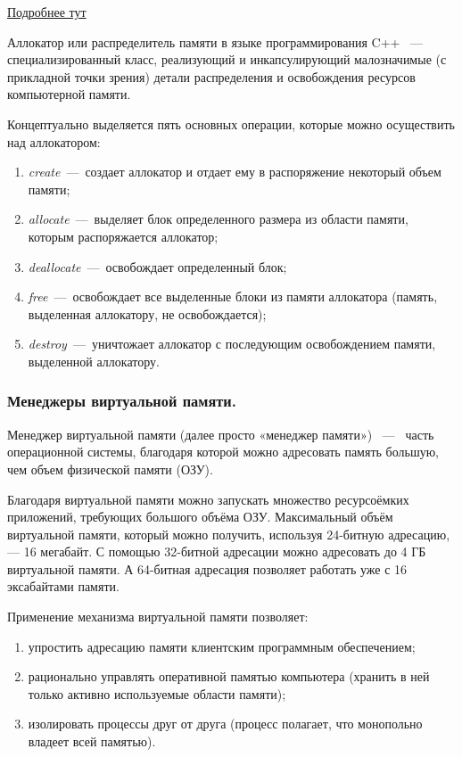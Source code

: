 \href{https://habr.com/ru/post/505632/}{Подробнее тут}

Аллокатор или распределитель памяти в языке программирования C++ ~---~ специализированный класс, реализующий и инкапсулирующий малозначимые (с прикладной точки зрения) детали распределения и освобождения ресурсов компьютерной памяти.

Концептуально выделяется пять основных операции, которые можно осуществить над аллокатором:
\begin{enumerate}
	\item \emph{create}~---~создает аллокатор и отдает ему в распоряжение некоторый объем памяти;
	\item \emph{allocate}~---~выделяет блок определенного размера из области памяти, которым распоряжается аллокатор;
	\item \emph{deallocate}~---~освобождает определенный блок;
	\item \emph{free}~---~освобождает все выделенные блоки из памяти аллокатора (память, выделенная аллокатору, не освобождается);
	\item \emph{destroy}~---~уничтожает аллокатор с последующим освобождением памяти, выделенной аллокатору.
\end{enumerate}

\subsubsection{Менеджеры виртуальной памяти.}

Менеджер виртуальной памяти (далее просто «менеджер памяти») ~---~ часть операционной системы, благодаря которой можно адресовать память большую, чем объем физической памяти (ОЗУ).

Благодаря виртуальной памяти можно запускать множество ресурсоёмких приложений, требующих большого объёма ОЗУ. Максимальный объём виртуальной памяти, который можно получить, используя 24-битную адресацию, — 16 мегабайт. С помощью 32-битной адресации можно адресовать до 4 ГБ виртуальной памяти. А 64-битная адресация позволяет работать уже с 16 эксабайтами памяти.

Применение механизма виртуальной памяти позволяет:

\begin{enumerate}
	\item упростить адресацию памяти клиентским программным обеспечением;
	\item рационально управлять оперативной памятью компьютера (хранить в ней только активно используемые области памяти);
	\item изолировать процессы друг от друга (процесс полагает, что монопольно владеет всей памятью).
\end{enumerate}
